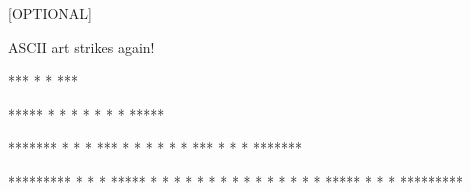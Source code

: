 [OPTIONAL]

ASCII art strikes again!

\resett
\nextt
\begin{console}[commandchars=\\\{\}]
***
* *
***
\end{console}

\nextt
\begin{console}[commandchars=\\\{\}]
*****
*   *
* * *
*   *
*****
\end{console}

\nextt
\begin{console}[commandchars=\\\{\}]
*******
*     *
* *** *
* * * *
* *** *
*     *
*******
\end{console}

\nextt
\begin{console}[commandchars=\\\{\}]
*********
*       *
* ***** *
* *   * *
* * * * *
* *   * *
* ***** *
*       *
*********
\end{console}
